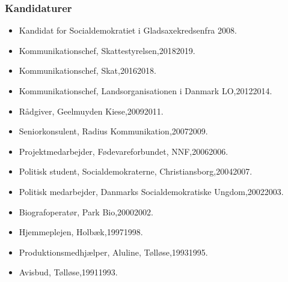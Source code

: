 \documentclass[11pt, a4paper]{awesome-cv}
\begin{document}
\begin{cvletter}
\subsubsection*{Kandidaturer}
\begin{itemize}
\item Kandidat for Socialdemokratiet i Gladsaxekredsenfra 2008.
\end{itemize}
\begin{itemize}
\item Kommunikationschef, Skattestyrelsen,20182019.
\item Kommunikationschef, Skat,20162018.
\item Kommunikationschef, Landsorganisationen i Danmark LO,20122014.
\item Rådgiver, Geelmuyden Kiese,20092011.
\item Seniorkonsulent, Radius Kommunikation,20072009.
\item Projektmedarbejder, Fødevareforbundet, NNF,20062006.
\item Politisk student, Socialdemokraterne, Christiansborg,20042007.
\item Politisk medarbejder, Danmarks Socialdemokratiske Ungdom,20022003.
\item Biografoperatør, Park Bio,20002002.
\item Hjemmeplejen, Holbæk,19971998.
\item Produktionsmedhjælper, Aluline, Tølløse,19931995.
\item Avisbud, Tølløse,19911993.
\end{itemize}
\end{cvletter}
\end{document}
